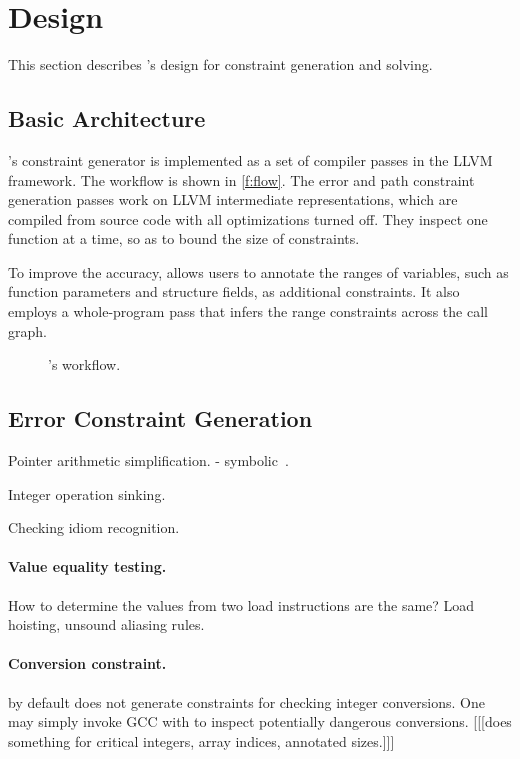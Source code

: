 \section{Design}
\label{s:gen}

This section describes \sys's design for constraint generation and
solving.

\subsection{Basic Architecture}

\sys's constraint generator is implemented as a set of compiler
passes in the LLVM~\cite{lattner:llvm} framework.  The workflow is
shown in \autoref{f:flow}.  The error and path constraint generation
passes work on LLVM intermediate representations, which are compiled
from source code with all optimizations turned off.  They inspect
one function at a time, so as to bound the size of constraints.

To improve the accuracy, \sys allows users to annotate the ranges
of variables, such as function parameters and structure fields, as
additional constraints. It also employs a whole-program pass that
infers the range constraints across the call graph.

\begin{figure}
\centering
\resizebox{0.9\linewidth}{!}{

}
\caption{\sys's workflow.}
\label{f:flow}
\end{figure}

\subsection{Error Constraint Generation}


Pointer arithmetic simplification.
- symbolic~\cite{engelen:symbolic}.

Integer operation sinking.

Checking idiom recognition.

\paragraph{Value equality testing.}
How to determine the values from two load instructions
are the same? Load hoisting, unsound aliasing rules.

\paragraph{Conversion constraint.}
\sys by default does not generate constraints for checking integer
conversions.  One may simply invoke GCC with  to
inspect potentially dangerous conversions.
[[[\sys does something for critical integers, array indices, annotated sizes.]]]

